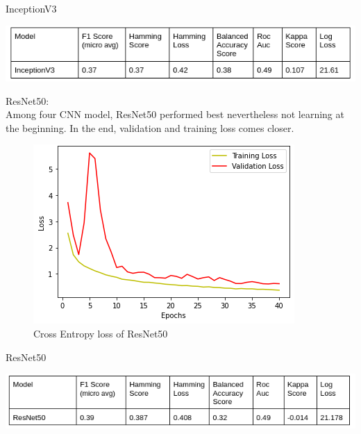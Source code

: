 \documentclass[sigconf]{acmart}
\begin{document}
\begin{table}[h]
  \centering
   \caption{InceptionV3}
  \includegraphics[width=\linewidth]{../supplements/Inceptionv3.png}
 
  \label{Tab.2}
\end{table}
ResNet50:\\
Among four CNN model, ResNet50 performed best nevertheless not learning at the beginning. In the end, validation and training loss comes closer.\\
\begin{figure}[h]
  \centering
   
  \includegraphics[width=\linewidth]{../supplements/7.ResNet.png}
 
\caption{Cross Entropy loss of ResNet50
}
  \label{Fig.7}
\end{figure}

\begin{table}[h]
  \centering
   \caption{ResNet50}
  \includegraphics[width=\linewidth]{../supplements/resnet50.png}
 
  \label{Tab.3}
\end{table}
\end{document}
